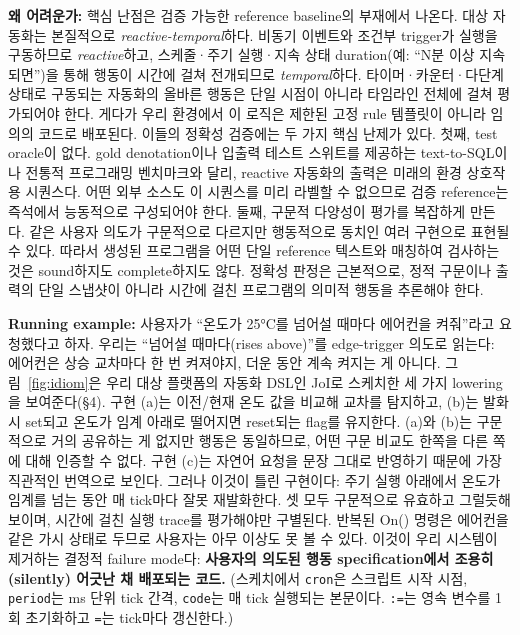\documentclass[sigconf,nonacm,anonymous,review]{acmart}
\begin{document}
\textbf{왜 어려운가:} 핵심 난점은 검증 가능한 reference baseline의 부재에서 나온다. 대상 자동화는 본질적으로 \emph{reactive-temporal}하다. 비동기 이벤트와 조건부 trigger가 실행을 구동하므로 \emph{reactive}하고, 스케줄·주기 실행·지속 상태 duration(예: ``N분 이상 지속되면'')을 통해 행동이 시간에 걸쳐 전개되므로 \emph{temporal}하다. 타이머·카운터·다단계 상태로 구동되는 자동화의 올바른 행동은 단일 시점이 아니라 타임라인 전체에 걸쳐 평가되어야 한다. 게다가 우리 환경에서 이 로직은 제한된 고정 rule 템플릿이 아니라 임의의 코드로 배포된다. 이들의 정확성 검증에는 두 가지 핵심 난제가 있다. 첫째, test oracle이 없다. gold denotation이나 입출력 테스트 스위트를 제공하는 text-to-SQL이나 전통적 프로그래밍 벤치마크와 달리, reactive 자동화의 출력은 미래의 환경 상호작용 시퀀스다. 어떤 외부 소스도 이 시퀀스를 미리 라벨할 수 없으므로 검증 reference는 즉석에서 능동적으로 구성되어야 한다. 둘째, 구문적 다양성이 평가를 복잡하게 만든다. 같은 사용자 의도가 구문적으로 다르지만 행동적으로 동치인 여러 구현으로 표현될 수 있다. 따라서 생성된 프로그램을 어떤 단일 reference 텍스트와 매칭하여 검사하는 것은 sound하지도 complete하지도 않다. 정확성 판정은 근본적으로, 정적 구문이나 출력의 단일 스냅샷이 아니라 시간에 걸친 프로그램의 의미적 행동을 추론해야 한다.

\textbf{Running example:} 사용자가 ``온도가 25°C를 넘어설 때마다 에어컨을 켜줘''라고 요청했다고 하자. 우리는 ``넘어설 때마다(rises above)''를 edge-trigger 의도로 읽는다: 에어컨은 상승 교차마다 한 번 켜져야지, 더운 동안 계속 켜지는 게 아니다. 그림~\ref{fig:idiom}은 우리 대상 플랫폼의 자동화 DSL인 JoI로 스케치한 세 가지 lowering을 보여준다(\S4). 구현 (a)는 이전/현재 온도 값을 비교해 교차를 탐지하고, (b)는 발화 시 set되고 온도가 임계 아래로 떨어지면 reset되는 flag를 유지한다. (a)와 (b)는 구문적으로 거의 공유하는 게 없지만 행동은 동일하므로, 어떤 구문 비교도 한쪽을 다른 쪽에 대해 인증할 수 없다. 구현 (c)는 자연어 요청을 문장 그대로 반영하기 때문에 가장 직관적인 번역으로 보인다. 그러나 이것이 틀린 구현이다: 주기 실행 아래에서 온도가 임계를 넘는 동안 매 tick마다 잘못 재발화한다. 셋 모두 구문적으로 유효하고 그럴듯해 보이며, 시간에 걸친 실행 trace를 평가해야만 구별된다. 반복된 On() 명령은 에어컨을 같은 가시 상태로 두므로 사용자는 아무 이상도 못 볼 수 있다. 이것이 우리 시스템이 제거하는 결정적 failure mode다: \textbf{사용자의 의도된 행동 specification에서 조용히(silently) 어긋난 채 배포되는 코드.} (스케치에서 \texttt{cron}은 스크립트 시작 시점, \texttt{period}는 ms 단위 tick 간격, \texttt{code}는 매 tick 실행되는 본문이다. \texttt{:=}는 영속 변수를 1회 초기화하고 \texttt{=}는 tick마다 갱신한다.)
\end{document}
